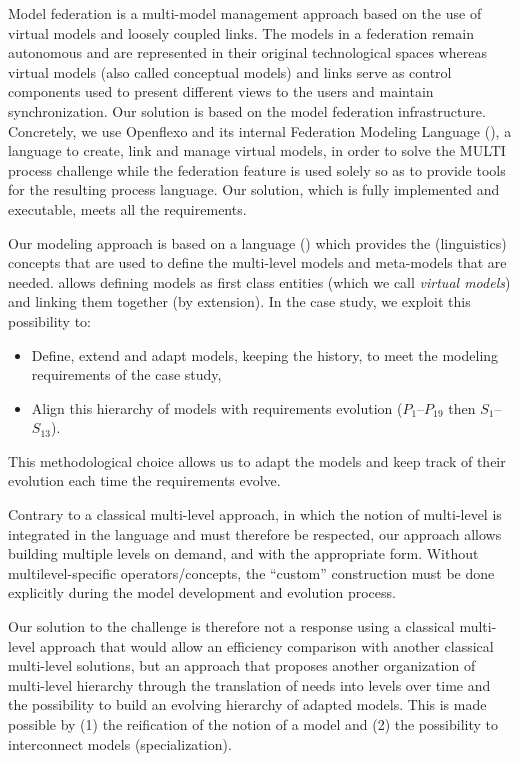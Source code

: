 Model federation is a multi-model management approach based on the use of
virtual models and loosely coupled links. The models in a federation remain
autonomous and are represented in their original technological spaces whereas
virtual models (also called conceptual models) and links serve as control
components used to present different views to the users and maintain
synchronization. Our solution is based on the model federation infrastructure.
Concretely, we use Openflexo and its internal Federation Modeling Language
(\FML), a language to create, link and manage virtual models, in order to solve
the MULTI process challenge while the federation feature is used solely so as
to provide tools for the resulting process language. Our solution, which is
fully implemented and executable, meets all the requirements.

Our modeling approach is based on a language (\FML) which provides the
(linguistics) concepts that are used to define the multi-level models and
meta-models that are needed. \FML allows defining models as first class
entities (which we call \emph{virtual models}) and linking them together (by
extension). In the \mpc case study, we exploit this possibility to:
\begin{itemize}
    \item Define, extend and adapt models, keeping the history, to meet the %
    modeling requirements of the case study,
    \item Align this hierarchy of models with requirements evolution
      ($P_1$--$P_{19}$ then $S_1$--$S_{13}$).
\end{itemize}
This methodological choice allows us to adapt the models and keep track of their evolution each time the requirements evolve.

Contrary to a classical multi-level approach, in which the notion of
multi-level is integrated in the language and must therefore be respected, our
approach allows building multiple levels on demand, and with the appropriate form.
Without multilevel-specific operators/concepts, the \enquote{custom}
construction must be done explicitly during the model development and evolution
process.

Our solution to the challenge is therefore not a response using a classical multi-level approach that would allow an efficiency comparison with another classical multi-level solutions, but an approach that proposes another organization of multi-level hierarchy through the translation of needs into levels over time and the possibility to build an evolving hierarchy of adapted models. This is made possible by (1) the reification of the notion of a model and (2) the possibility to interconnect models (specialization).%

